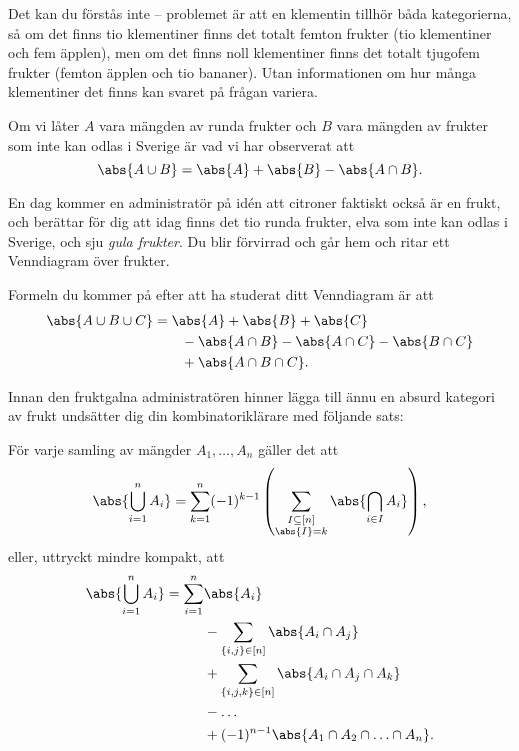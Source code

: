 \documentclass[nobib]{tufte-handout}
\begin{document}
Det kan du förstås inte -- problemet är att en klementin tillhör båda kategorierna, så om det finns tio klementiner finns det totalt femton frukter (tio klementiner och fem äpplen), men om det finns noll klementiner finns det totalt tjugofem frukter (femton äpplen och tio bananer). Utan informationen om hur många klementiner det finns kan svaret på frågan variera.

Om vi låter $A$ vara mängden av runda frukter och $B$ vara mängden av frukter som inte kan odlas i Sverige är vad vi har observerat att
$$\abs{A \cup B} = \abs{A} + \abs{B} - \abs{A \cap B}.$$

En dag kommer en administratör på idén att citroner faktiskt också är en frukt, och berättar för dig att idag finns det tio runda frukter, elva som inte kan odlas i Sverige, och sju \emph{gula frukter}. Du blir förvirrad och går hem och ritar ett Venndiagram över frukter.

Formeln du kommer på efter att ha studerat ditt Venndiagram är att
\begin{align*}
  \abs{A \cup B \cup C} &= \abs{A} + \abs{B} + \abs{C}\\
  &\qquad - \abs{A \cap B} - \abs{A \cap C} - \abs{B \cap C}\\
  &\qquad + \abs{A \cap B \cap C}.
\end{align*}

Innan den fruktgalna administratören hinner lägga till ännu en absurd kategori av frukt undsätter dig din kombinatoriklärare med följande sats:
\begin{theorem}\label{theorem_inclusion_exclusion}
  För varje samling av mängder $A_1, \ldots, A_n$ gäller det att
  $$\abs{\bigcup_{i=1}^n A_i} = \sum_{k=1}^{n} (-1)^{k-1}\left(\sum_{\substack{I \subseteq [n]\\\abs{I} = k}} \abs{\bigcap_{i \in I} A_i}\right),$$
  eller, uttryckt mindre kompakt, att
  \begin{align*}
    \abs{\bigcup_{i=1}^n A_i} = \sum_{i=1}^n &\abs{A_i}\\
    & - \sum_{\{i,j\} \in [n]} \abs{A_i \cap A_j}\\
    & + \sum_{ \{i, j, k\} \in [n] } \abs{A_i \cap A_j \cap A_k}\\
    & - \ldots\\
    & + (-1)^{n-1}\abs{A_1\cap A_2\cap\ldots\cap A_n}.
  \end{align*}
\end{theorem}
\end{document}
